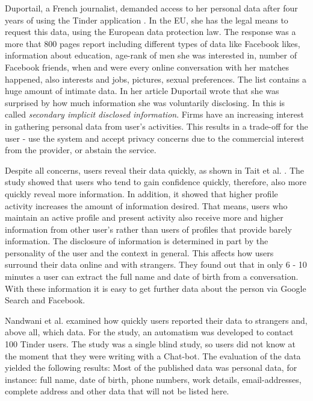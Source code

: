 Duportail, a French journalist, demanded access to her personal data after four years of using the Tinder application \cite{taylor2009privacy}. In the \acs{EU}, she has the legal means to request this data, using the European data protection law. The response was a more that 800 pages report including different types of data like Facebook likes, information about education, age-rank of men she was interested in, number of Facebook friends, when and were every online conversation with her matches happened, also interests and jobs, pictures, sexual preferences. The list contains a huge amount of intimate data. In her article Duportail wrote that she was surprised by how much information she was voluntarily disclosing.
In \cite{taylor2009privacy} this is called \textit{secondary implicit disclosed information}. Firms have an increasing interest in gathering personal data from user's activities. This results in a trade-off for the user - use the system and accept privacy concerns due to the commercial interest from the provider, or abstain the service.

Despite all concerns, users reveal their data quickly, as shown in Tait et al. \cite{tait2015hello}. 
The study showed that users who tend to gain confidence quickly, therefore, also more quickly reveal more information. In addition, it showed that higher profile activity increases the amount of information desired. 
That means, users who maintain an active profile and present activity also receive more and higher information from other user's rather than users of profiles that provide barely information. The disclosure of information is determined in part by the personality of the user and the context in general. This affects how users surround their data online and with strangers. They found out that in only 6 - 10 minutes a user can extract the full name and date of birth from a conversation. With these information it is easy to get further data about the person via Google Search and Facebook.

Nandwani et al. \cite{10.1007/978-3-319-61542-4_32} examined how quickly users reported their data to strangers and, above all, which data. For the study, an automatism was developed to contact 100 Tinder users. The study was a single blind study, so users did not know at the moment that they were writing with a Chat-bot. The evaluation of the data yielded the following results: Most of the published data was personal data, for instance: full name, date of birth, phone numbers, work details, email-addresses, complete address and other data that will not be listed here.

